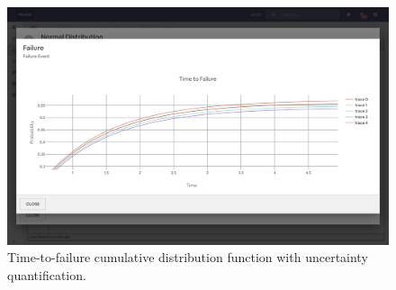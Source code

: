 \begin{figure}
  \centering
  \includegraphics[width=\textwidth]{4_proposed_solution/web_app/figures/ttf.png}
  \caption{Time-to-failure cumulative distribution function with uncertainty quantification.}
  \label{fig:ttf_cdf}
\end{figure}
